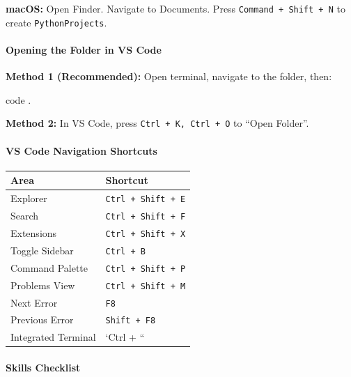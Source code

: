 \documentclass[
  justified,
  openright,
]{tufte-book}
\let\subsubsection\paragraph
\let\paragraph\paragraph
\newcommand{\ExtensionTok}[1]{#1}
\newcommand{\NormalTok}[1]{#1}
\newenvironment{Shaded}{%
  \begin{snugshade}
}{%
  \end{snugshade}
}
\let\subsubsection\paragraph
\let\paragraph\paragraph
\begin{document}
\textbf{macOS:} Open Finder. Navigate to Documents. Press
\texttt{Command\ +\ Shift\ +\ N} to create \texttt{PythonProjects}.

\subsubsection{Opening the Folder in VS
Code}\label{opening-the-folder-in-vs-code}

\textbf{Method 1 (Recommended):} Open terminal, navigate to the folder,
then:

\begin{Shaded}
\begin{Highlighting}[]
\ExtensionTok{code}\NormalTok{ .}
\end{Highlighting}
\end{Shaded}

\textbf{Method 2:} In VS Code, press \texttt{Ctrl\ +\ K,\ Ctrl\ +\ O} to
``Open Folder''.

\subsubsection{VS Code Navigation
Shortcuts}\label{vs-code-navigation-shortcuts}

{\def\LTcaptype{none} %
\begin{longtable}[]{@{}ll@{}}
\toprule\noalign{}
Area & Shortcut \\
\midrule\noalign{}
\endhead
\bottomrule\noalign{}
\endlastfoot
Explorer & \texttt{Ctrl\ +\ Shift\ +\ E} \\
Search & \texttt{Ctrl\ +\ Shift\ +\ F} \\
Extensions & \texttt{Ctrl\ +\ Shift\ +\ X} \\
Toggle Sidebar & \texttt{Ctrl\ +\ B} \\
Command Palette & \texttt{Ctrl\ +\ Shift\ +\ P} \\
Problems View & \texttt{Ctrl\ +\ Shift\ +\ M} \\
Next Error & \texttt{F8} \\
Previous Error & \texttt{Shift\ +\ F8} \\
Integrated Terminal & `Ctrl + `` \\
\end{longtable}
}

\subsubsection{Skills Checklist}\label{skills-checklist-2}
\end{document}

